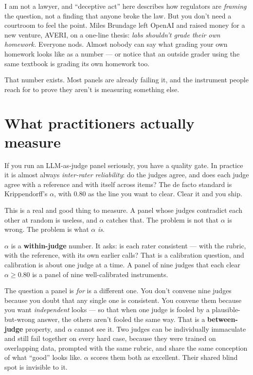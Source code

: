 \documentclass[11pt,a4paper]{article}
\begin{document}
I am not a lawyer, and ``deceptive act'' here describes how regulators are \emph{framing} the
question, not a finding that anyone broke the law. But you don't need a courtroom to feel the point.
Miles Brundage left OpenAI and raised money for a new venture, AVERI, on a one-line thesis:
\emph{labs shouldn't grade their own homework.} Everyone nods. Almost nobody can say what grading
your own homework looks like as a number --- or notice that an outside grader using the same
textbook is grading its own homework too.

That number exists. Most panels are already failing it, and the instrument people reach for to prove
they aren't is measuring something else.

\section{What practitioners actually measure}

If you run an LLM-as-judge panel seriously, you have a quality gate. In practice it is almost
always \emph{inter-rater reliability}: do the judges agree, and does each judge agree with a
reference and with itself across items? The de facto standard is Krippendorff's $\alpha$, with 0.80
as the line you want to clear. Clear it and you ship.

This is a real and good thing to measure. A panel whose judges contradict each other at random is
useless, and $\alpha$ catches that. The problem is not that $\alpha$ is wrong. The problem is what
$\alpha$ \emph{is}.

$\alpha$ is a \textbf{within-judge} number. It asks: is each rater consistent --- with the rubric,
with the reference, with its own earlier calls? That is a calibration question, and calibration is
about one judge at a time. A panel of nine judges that each clear $\alpha \geq 0.80$ is a panel of
nine well-calibrated instruments.

The question a panel is \emph{for} is a different one. You don't convene nine judges because you
doubt that any single one is consistent. You convene them because you want \emph{independent} looks
--- so that when one judge is fooled by a plausible-but-wrong answer, the others aren't fooled the
same way. That is a \textbf{between-judge} property, and $\alpha$ cannot see it. Two judges can be
individually immaculate and still fail together on every hard case, because they were trained on
overlapping data, prompted with the same rubric, and share the same conception of what ``good''
looks like. $\alpha$ scores them both as excellent. Their shared blind spot is invisible to it.
\end{document}
